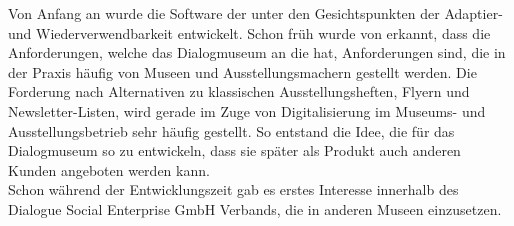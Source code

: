 Von Anfang an wurde die Software der \shst{} unter den Gesichtspunkten der Adaptier- und Wiederverwendbarkeit
entwickelt. Schon früh wurde von \meso{} erkannt, dass die Anforderungen, welche das Dialogmuseum an die \shst{} hat, 
Anforderungen sind, die in der Praxis häufig von Museen und Ausstellungsmachern gestellt werden. Die Forderung
nach Alternativen zu klassischen Ausstellungsheften, Flyern und Newsletter-Listen, wird gerade im Zuge von
Digitalisierung im Museums- und Ausstellungsbetrieb sehr häufig gestellt.
So entstand die Idee, die \shst{} für das Dialogmuseum so zu entwickeln, dass sie später als Produkt auch
anderen Kunden angeboten werden kann.\\
Schon während der Entwicklungszeit gab es erstes Interesse innerhalb des Dialogue Social Enterprise GmbH Verbands, 
die \shst{} in anderen Museen einzusetzen. 
